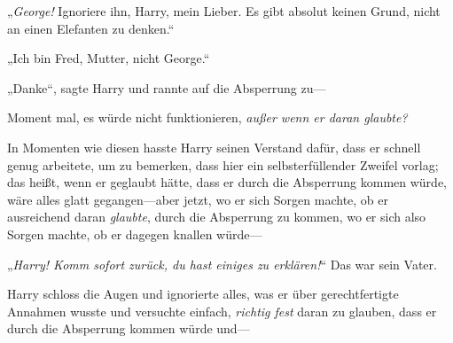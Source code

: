 „\emph{George!} Ignoriere ihn, Harry, mein Lieber. Es gibt absolut keinen Grund, nicht an einen Elefanten zu denken.“

„Ich bin Fred, Mutter, nicht George.“

„Danke“, sagte Harry und rannte auf die Absperrung zu—

Moment mal, es würde nicht funktionieren, \emph{außer wenn er daran glaubte?}

In Momenten wie diesen hasste Harry seinen Verstand dafür, dass er schnell genug arbeitete, um zu bemerken, dass hier ein selbsterfüllender Zweifel vorlag; das heißt, wenn er geglaubt hätte, dass er durch die Absperrung kommen würde, wäre alles glatt gegangen—aber jetzt, wo er sich Sorgen machte, ob er ausreichend daran \emph{glaubte}, durch die Absperrung zu kommen, wo er sich also Sorgen machte, ob er dagegen knallen würde—

„\emph{Harry! Komm sofort zurück, du hast einiges zu erklären!}“ Das war sein Vater.

Harry schloss die Augen und ignorierte alles, was er über gerechtfertigte Annahmen wusste und versuchte einfach, \emph{richtig fest} daran zu glauben, dass er durch die Absperrung kommen würde und—

